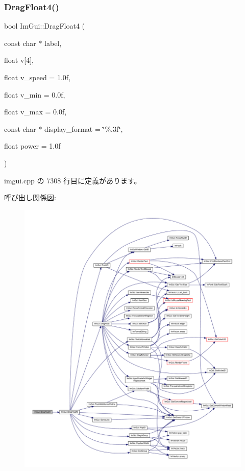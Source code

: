 \subsubsection{\texorpdfstring{Drag\+Float4()}{DragFloat4()}}
{\footnotesize\ttfamily bool Im\+Gui\+::\+Drag\+Float4 (\begin{DoxyParamCaption}\item[{const char $\ast$}]{label,  }\item[{float}]{v\mbox{[}4\mbox{]},  }\item[{float}]{v\+\_\+speed = {\ttfamily 1.0f},  }\item[{float}]{v\+\_\+min = {\ttfamily 0.0f},  }\item[{float}]{v\+\_\+max = {\ttfamily 0.0f},  }\item[{const char $\ast$}]{display\+\_\+format = {\ttfamily \char`\"{}\%.3f\char`\"{}},  }\item[{float}]{power = {\ttfamily 1.0f} }\end{DoxyParamCaption})}



 imgui.\+cpp の 7308 行目に定義があります。

呼び出し関係図\+:\nopagebreak
\begin{figure}[H]
\begin{center}
\leavevmode
\includegraphics[width=350pt]{namespace_im_gui_a6dfd9e5d7adc6106e9391fc971d2f8bc_cgraph}
\end{center}
\end{figure}
\mbox{\label{namespace_im_gui_a2a2764b6f0b3291ad0df4d99127dd751}} 
